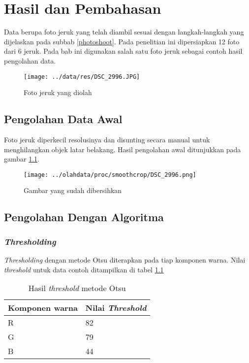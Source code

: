 \documentclass[laporan.tex]{subfiles}
\begin{document}
\chapter{Hasil dan Pembahasan}

Data berupa foto jeruk yang telah diambil sesuai dengan langkah-langkah yang dijelaskan pada subbab \ref{photoshoot}. Pada penelitian ini dipersiapkan 12 foto dari 6 jeruk. Pada bab ini digunakan salah satu foto jeruk sebagai contoh hasil pengolahan data.

\begin{figure}[h]
\centering
\texttt{[image: ../data/res/DSC\_2996.JPG]}
\caption{Foto jeruk yang diolah}
\end{figure}

\section{Pengolahan Data Awal}

Foto jeruk diperkecil resolusinya dan disunting secara manual untuk menghilangkan objek latar belakang. Hasil pengolahan awal ditunjukkan pada gambar \ref{fig:imgedited}.

\begin{figure}[h]
\centering
\texttt{[image: ../olahdata/proc/smoothcrop/DSC\_2996.png]}
\caption{Gambar yang sudah dibersihkan}
\label{fig:imgedited}
\end{figure}

\section{Pengolahan Dengan Algoritma}

\subsection{\emph{Thresholding}}

\emph{Thresholding} dengan metode Otsu diterapkan pada tiap komponen warna. Nilai \emph{threshold} untuk data contoh ditampilkan di tabel \ref{table:threshval}

\begin{table}[h]
\centering
\begin{tabular}{|l|l|}
\hline
Komponen warna & Nilai \emph{Threshold} \\
\hline
R & 82 \\
G & 79 \\
B & 44 \\
\hline
\end{tabular}
\caption{Hasil \emph{threshold} metode Otsu}
\label{table:threshval}
\end{table}
\end{document}
